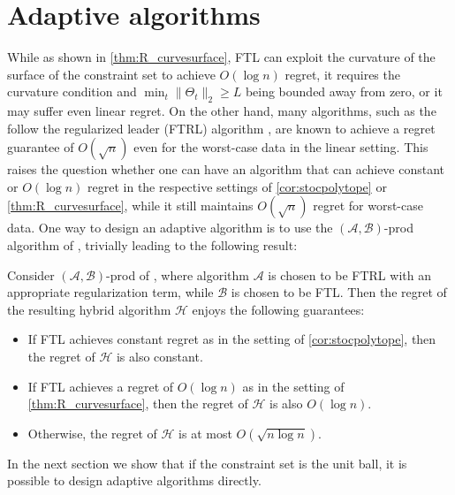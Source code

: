 \documentclass[english]{article}
\newcommand{\todoa}[2][]{\todo[color=Purple!20,size=\tiny,#1]{A: #2}}
\newcommand{\cA}{\mathcal{A}}
\newcommand{\cB}{\mathcal{B}}
\newcommand{\cH}{\mathcal{H}}
\begin{document}
\section{Adaptive algorithms} %
While as shown in \cref{thm:R_curvesurface}, FTL can exploit the curvature of the surface of the constraint set to achieve $O(\log n)$ regret, it requires the curvature condition and $\min_t \|\Theta_t\|_2 \ge L$ being bounded away from zero, or
 it may suffer even linear regret.
On the other hand, many algorithms,  such as the follow the regularized leader (FTRL) algorithm \citep[see,e.g.,][]{SS12:Book}, are known to achieve a regret guarantee of $O(\sqrt{n})$ even for the worst-case data in the linear setting.
This raises the question whether one can have an algorithm that can 
achieve constant or $O(\log n)$ regret in the respective settings of  \cref{cor:stocpolytope} or \cref{thm:R_curvesurface},
while it still maintains $O(\sqrt{n})$ regret for worst-case data. 
One way to design an adaptive algorithm is to use the $(\cA, \cB)$-prod algorithm of \citet{sani2014exploiting}, trivially leading to the following result:
\begin{proposition}
Consider $(\cA,\cB)$-prod of \citet{sani2014exploiting}, where algorithm \todoa{Do we need to write out $(\cA,\cB)$-prod?}
 $\cA$ is chosen to be FTRL with an appropriate regularization term, 
 while $\cB$ is chosen to be FTL. 
Then the regret of the resulting hybrid algorithm $\cH$ enjoys the following guarantees:
\begin{itemize}\setlength{\itemsep}{0pt}
\item If FTL achieves constant regret as in the setting of \cref{cor:stocpolytope}, then the regret of $\cH$ is also constant.
\item If FTL achieves a regret of $O(\log n)$ as in the setting of \cref{thm:R_curvesurface}, then the regret of $\cH$ is also $O(\log n)$.
\item Otherwise, the regret of $\cH$ is at most $O(\sqrt{n\log n})$.
\end{itemize}
\end{proposition} 

In the next section we show that if the constraint set is the unit ball, it is possible to design adaptive algorithms directly.
\end{document}
